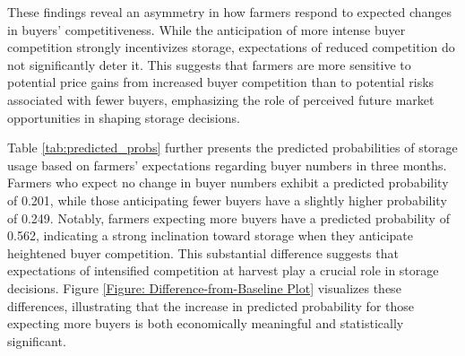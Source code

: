 \documentclass[12pt]{article}
\begin{document}
These findings reveal an asymmetry in how farmers respond to expected changes in buyers' competitiveness. While the anticipation of more intense buyer competition strongly incentivizes storage, expectations of reduced competition do not significantly deter it. This suggests that farmers are more sensitive to potential price gains from increased buyer competition than to potential risks associated with fewer buyers, emphasizing the role of perceived future market opportunities in shaping storage decisions.


Table \ref{tab:predicted_probs} further presents the predicted probabilities of storage usage based on farmers’ expectations regarding buyer numbers in three months. Farmers who expect no change in buyer numbers exhibit a predicted probability of 0.201, while those anticipating fewer buyers have a slightly higher probability of 0.249. Notably, farmers expecting more buyers have a predicted probability of 0.562, indicating a strong inclination toward storage when they anticipate heightened buyer competition. This substantial difference suggests that expectations of intensified competition at harvest play a crucial role in storage decisions. Figure \ref{Figure: Difference-from-Baseline Plot} visualizes these differences, illustrating that the increase in predicted probability for those expecting more buyers is both economically meaningful and statistically significant.



\end{document}
